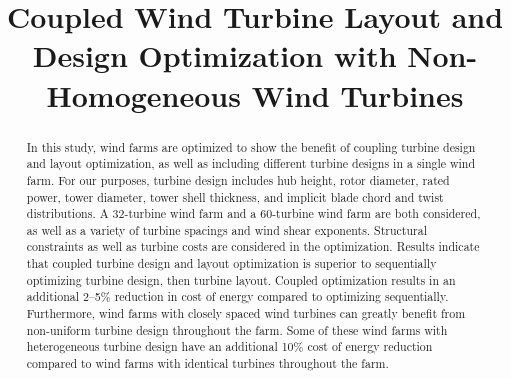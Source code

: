 \documentclass[wes, manuscript]{copernicus}
\begin{document}
\title{Coupled Wind Turbine Layout and Design Optimization with Non-Homogeneous Wind Turbines}








\received{}
\pubdiscuss{} 
\revised{}
\accepted{}
\published{}




\maketitle



\begin{abstract}
In this study, wind farms are optimized to show the benefit of coupling turbine design and layout optimization, as well as including different turbine designs in a single wind farm. For our purposes, turbine design includes hub height, rotor diameter, rated power, tower diameter, tower shell thickness, and implicit blade chord and twist distributions. A 32-turbine wind farm and a 60-turbine wind farm are both considered, as well as a variety of turbine spacings and wind shear exponents. Structural constraints as well as turbine costs are considered in the optimization. Results indicate that coupled turbine design and layout optimization is superior to sequentially optimizing turbine design, then turbine layout. Coupled optimization results in an additional  2--5\% reduction in cost of energy compared to optimizing sequentially. Furthermore, wind farms with closely spaced wind turbines can greatly benefit from non-uniform turbine design throughout the farm. Some of these wind farms with heterogeneous turbine design have an additional 10\% cost of energy reduction compared to wind farms with identical turbines throughout the farm.
\end{abstract}




\introduction 

\end{document}
